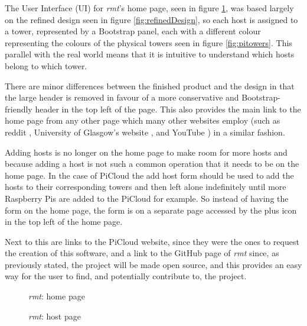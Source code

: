 \label{sec:implUi}
The User Interface (UI) for \emph{rmt}'s home page, seen in figure \ref{fig:rmtCurrent}, was based largely on the refined design seen in figure \ref{fig:refinedDesign}, so each host is assigned to a tower, represented by a Bootstrap panel, each with a different colour representing the colours of the physical towers seen in figure \ref{fig:pitowers}.
This parallel with the real world means that it is intuitive to understand which hosts belong to which tower.

There are minor differences between the finished product and the design in that the large header is removed in favour of a more conservative and Bootstrap-friendly header in the top left of the page.
This also provides the main link to the home page from any other page which many other websites employ (such as reddit \citep{reddit}, University of Glasgow's website \citep{glaWebsite}, and YouTube \citep{youtube}) in a similar fashion.

Adding hosts is no longer on the home page to make room for more hosts and because adding a host is not such a common operation that it needs to be on the home page.
In the case of PiCloud the add host form should be used to add the hosts to their corresponding towers and then left alone indefinitely until more Raspberry Pis are added to the PiCloud for example.
So instead of having the form on the home page, the form is on a separate page accessed by the plus icon in the top left of the home page.

Next to this are links to the PiCloud website, since they were the ones to request the creation of this software, and a link to the GitHub page of \emph{rmt} since, as previously stated, the project will be made open source, and this provides an easy way for the user to find, and potentially contribute to, the project.

\begin{figure}[t]
	\centering
	\setlength\fboxsep{0pt}
	\setlength\fboxrule{0.5pt}
	\caption{\emph{rmt}: home page}
	\label{fig:rmtCurrent}
\end{figure}

\begin{figure}[t]
	\centering
	\setlength\fboxsep{0pt}
	\setlength\fboxrule{0.5pt}
	\caption{\emph{rmt}: host page}
	\label{fig:rmtHostCurrent}
\end{figure}

